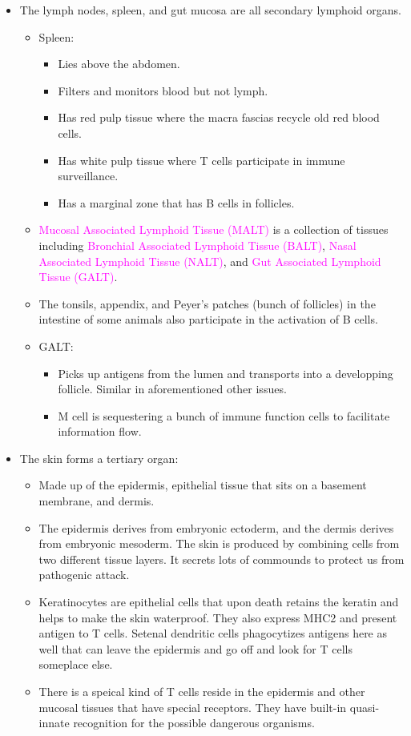 \documentclass[UTF8]{book}
\newcommand{\concept}[1]{\textcolor{magenta}{#1}}
\begin{document}
\begin{itemize}
\item The lymph nodes, spleen, and gut mucosa are all secondary lymphoid organs. \begin{itemize}
	\item Spleen:
	\begin{itemize}
		\item Lies above the abdomen.
		\item Filters and monitors blood but not lymph.
		\item Has red pulp tissue where the macra fascias recycle old red blood cells.
		\item Has white pulp tissue where T cells participate in immune surveillance.
		\item Has a marginal zone that has B cells in follicles.
	\end{itemize}
	\item \concept{Mucosal Associated Lymphoid Tissue (MALT)} is a collection of tissues including \concept{Bronchial Associated Lymphoid Tissue (BALT)}, \concept{Nasal Associated Lymphoid Tissue (NALT)}, and \concept{Gut Associated Lymphoid Tissue (GALT)}.
	\item The tonsils, appendix, and Peyer's patches (bunch of follicles) in the intestine of some animals also participate in the activation of B cells.
	\item GALT:
	\begin{itemize}
		\item Picks up antigens from the lumen and transports into a developping follicle. Similar in aforementioned other issues.
		\item M cell is sequestering a bunch of immune function cells to facilitate information flow.
	\end{itemize}
\end{itemize}
\item The skin forms a tertiary organ:
\begin{itemize}
	\item Made up of the epidermis, epithelial tissue that sits on a basement membrane, and dermis.
	\item The epidermis derives from embryonic ectoderm, and the dermis derives from embryonic mesoderm. The skin is produced by combining cells from two different tissue layers. It secrets lots of commounds to protect us from pathogenic attack.
	\item Keratinocytes are epithelial cells that upon death retains the keratin and helps to make the skin waterproof. They also express MHC2 and present antigen to T cells. Setenal dendritic cells phagocytizes antigens here as well that can leave the epidermis and go off and look for T cells someplace else.
	\item There is a speical kind of T cells reside in the epidermis and other mucosal tissues that have special receptors. They have built-in quasi-innate recognition for the possible dangerous organisms.
\end{itemize}
\end{itemize}
\end{document}
